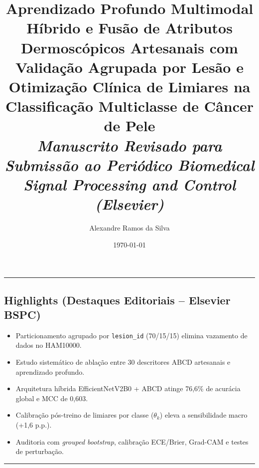 \documentclass[12pt,a4paper]{article}
\title{%
    \LARGE \textbf{Aprendizado Profundo Multimodal Híbrido e Fusão de Atributos Dermoscópicos Artesanais com Validação Agrupada por Lesão e Otimização Clínica de Limiares na Classificação Multiclasse de Câncer de Pele}\\[0.4em]
    \large \textit{Manuscrito Revisado para Submissão ao Periódico Biomedical Signal Processing and Control (Elsevier)}%
}
\author{Alexandre Ramos da Silva}
\date{\today}
\begin{document}
\maketitle

\noindent\rule{\textwidth}{0.5pt}
\subsection*{Highlights (Destaques Editoriais -- Elsevier BSPC)}
\begin{itemize}
    \item Particionamento agrupado por \texttt{lesion\_id} (70/15/15) elimina vazamento de dados no HAM10000.
    \item Estudo sistemático de ablação entre 30 descritores ABCD artesanais e aprendizado profundo.
    \item Arquitetura híbrida EfficientNetV2B0 + ABCD atinge 76,6\% de acurácia global e MCC de 0,603.
    \item Calibração pós-treino de limiares por classe ($\theta_k$) eleva a sensibilidade macro (+1,6 p.p.).
    \item Auditoria com \textit{grouped bootstrap}, calibração ECE/Brier, Grad-CAM e testes de perturbação.
\end{itemize}
\noindent\rule{\textwidth}{0.5pt}
\end{document}
